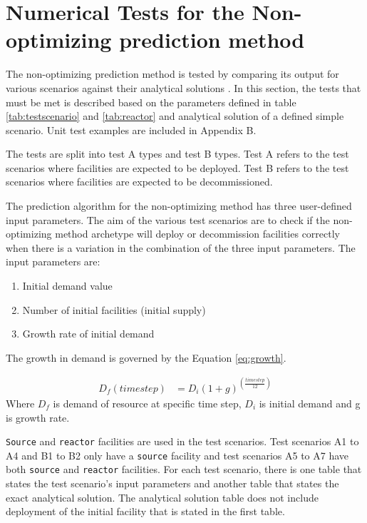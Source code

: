 \documentclass[11pt,letterpaper]{article}
\begin{document}
\pagebreak

\section{Numerical Tests for the Non-optimizing prediction method}
The non-optimizing prediction method is tested by comparing its output for various scenarios against their analytical solutions . In this section, the tests that must be met is described based on the parameters defined in table \ref{tab:testscenario} and \ref{tab:reactor} and analytical solution of a defined simple scenario. Unit test examples are included in Appendix B.

The tests are split into test A types and test B types. Test A refers to the test scenarios where facilities are expected to be deployed. Test B refers to the test scenarios where facilities are expected to be decommissioned. 

The prediction algorithm for the non-optimizing method has three user-defined input parameters. The aim of the various test scenarios are to check if the non-optimizing method archetype will deploy or decommission facilities correctly when there is a variation in the combination of the three input parameters.  The input parameters are: 
\begin{enumerate}
	\item Initial demand value  
	\item Number of initial facilities (initial supply)
	\item Growth rate of initial demand
\end{enumerate}

The growth in demand is governed by the Equation \ref{eq:growth}. 

\begin{align}
\label{eq:growth}
D_f(timestep) &= D_i(1+g)^{(\frac{timestep}{12})}
\end{align}
Where $D_f$ is demand of resource at specific time step, $D_i$ is initial demand and g is growth rate. 

\texttt{Source} and \texttt{reactor} facilities are used in the test scenarios. Test scenarios A1 to A4 and B1 to B2 only have a \texttt{source} facility and test scenarios A5 to A7 have both \texttt{source} and \texttt{reactor} facilities. For each test scenario, there is one table that states the test scenario's input parameters and another table that states the exact analytical solution. The analytical solution table does not include deployment of the initial facility that is stated in the first table.
\end{document}

